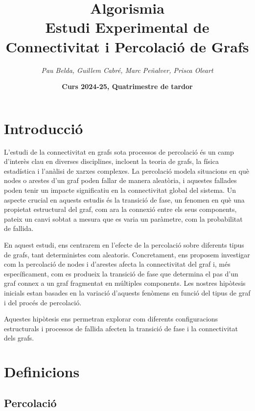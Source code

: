 \documentclass[a4paper]{article}
\title{\textbf{\huge Algorismia}\\[0.5cm]
	\textbf{\Large Estudi Experimental de Connectivitat i Percolació de Grafs}}
\author{\emph{Pau Belda, Guillem Cabré, Marc Peñalver, Prisca Oleart}}
\date{\textbf{Curs 2024-25, Quatrimestre de tardor}}
\begin{document}
	
	\begin{titlepage}
		\clearpage\maketitle
		\thispagestyle{empty}
	\end{titlepage}
	
	\tableofcontents
	\clearpage

	\section{Introducció}

	L'estudi de la connectivitat en grafs sota processos de percolació és un camp d'interès clau en diverses disciplines, incloent la teoria de grafs, la física estadística i l'anàlisi de xarxes complexes. La percolació modela situacions en què nodes o arestes d'un graf poden fallar de manera aleatòria, i aquestes fallades poden tenir un impacte significatiu en la connectivitat global del sistema. Un aspecte crucial en aquests estudis és la transició de fase, un fenomen en què una propietat estructural del graf, com ara la connexió entre els seus components, pateix un canvi sobtat a mesura que es varia un paràmetre, com la probabilitat de fallida. \\\endgraf
	
	En aquest estudi, ens centrarem en l'efecte de la percolació sobre diferents tipus de grafs, tant deterministes com aleatoris. Concretament, ens proposem investigar com la percolació de nodes i d'arestes afecta la connectivitat del graf i, més específicament, com es produeix la transició de fase que determina el pas d'un graf connex a un graf fragmentat en múltiples components. Les nostres hipòtesis inicials estan basades en la variació d'aquests fenòmens en funció del tipus de graf i del procés de percolació. \\\endgraf
	
	Aquestes hipòtesis ens permetran explorar com diferents configuracions estructurals i processos de fallida afecten la transició de fase i la connectivitat dels grafs.\\
	
	\newpage
	
	\section{Definicions}
		
	\subsection{Percolació}
	
\end{document}
